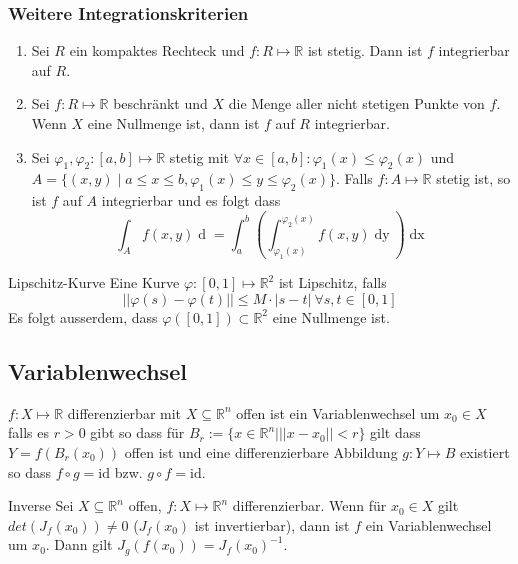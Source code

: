 \documentclass[a4paper,10pt]{article}
\def\R{\mathbb{R}}
\begin{document}
\subsubsection*{Weitere Integrationskriterien}
\begin{enumerate}
  \item Sei \(R\) ein kompaktes Rechteck und \(f: R \mapsto \R\) ist stetig. Dann ist \(f\) integrierbar auf \(R\).
  \item Sei \(f: R \mapsto \R\) beschränkt und \(X\) die Menge aller nicht stetigen Punkte von \(f\). Wenn \(X\) eine Nullmenge ist, dann ist \(f\) auf \(R\) integrierbar.
  \item Sei \(\varphi_1, \varphi_2: \left[a,b\right]\mapsto \R\) stetig mit \(\forall x \in \left[a,b\right]: \varphi_1(x) \le \varphi_2(x)\) und \(A = \{(x,y)\mid a\le x \le b, \varphi_1(x) \le y \le \varphi_2(x)\}\). Falls \(f: A \mapsto \R\) stetig ist, so ist \(f\) auf \(A\) integrierbar und es folgt dass
  \[\int_A f(x,y) \mathop{d(x,y)} = \int_a^b \left(\int_{\varphi_1(x)}^{\varphi_2(x)} f(x,y) \mathop{dy}\right) \mathop{dx}\]
\end{enumerate}

\begin{subbox}{Lipschitz-Kurve}
  Eine Kurve \(\varphi : \left[0, 1\right] \mapsto \R^2\) ist Lipschitz, falls
  \[||\varphi(s) - \varphi(t)|| \le M \cdot |s-t| \ \forall s,t \in \left[0,1\right]\]
  Es folgt ausserdem, dass \(\varphi(\left[0,1\right]) \subset \R^2\) eine Nullmenge ist.
\end{subbox}

\subsection{Variablenwechsel}

$f: X \mapsto \R$ differenzierbar mit $X \subseteq \R^n$ offen ist ein Variablenwechsel um $x_0 \in X$ falls es $r > 0$ gibt so dass für $B_r := \{x \in \R^n | ||x-x_0|| < r \}$ gilt dass $Y = f(B_r(x_0))$ offen ist und eine differenzierbare Abbildung $g: Y \mapsto B$ existiert so dass $f \circ g = \mathrm{id}$ bzw. $g \circ f = \mathrm{id}$.

\begin{subbox}{Inverse}
  Sei $X \subseteq \R^n$ offen, $f: X \mapsto \R^n$ differenzierbar. Wenn für $x_0 \in X$ gilt $det(J_f(x_0)) \neq 0$ ($J_f(x_0)$ ist invertierbar), dann ist $f$ ein Variablenwechsel um $x_0$. Dann gilt $J_g(f(x_0)) = J_f(x_0)^{-1}$.
\end{subbox}
\end{document}
